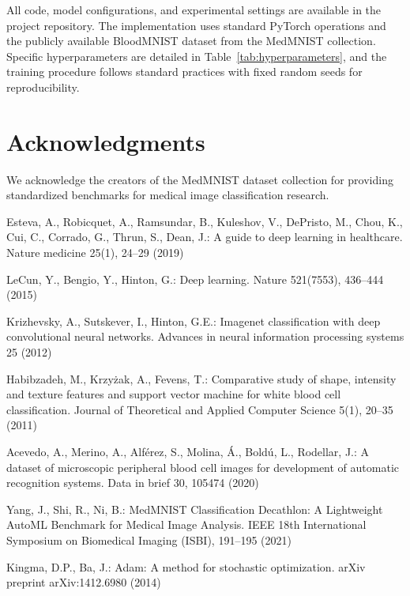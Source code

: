 \documentclass[runningheads]{llncs}
\begin{document}
All code, model configurations, and experimental settings are available in the project repository. The implementation uses standard PyTorch operations and the publicly available BloodMNIST dataset from the MedMNIST collection. Specific hyperparameters are detailed in Table~\ref{tab:hyperparameters}, and the training procedure follows standard practices with fixed random seeds for reproducibility.

\section*{Acknowledgments}

We acknowledge the creators of the MedMNIST dataset collection for providing standardized benchmarks for medical image classification research.

\begin{thebibliography}{10}

Esteva, A., Robicquet, A., Ramsundar, B., Kuleshov, V., DePristo, M., Chou, K., Cui, C., Corrado, G., Thrun, S., Dean, J.:
A guide to deep learning in healthcare.
Nature medicine 25(1), 24--29 (2019)

LeCun, Y., Bengio, Y., Hinton, G.:
Deep learning.
Nature 521(7553), 436--444 (2015)

Krizhevsky, A., Sutskever, I., Hinton, G.E.:
Imagenet classification with deep convolutional neural networks.
Advances in neural information processing systems 25 (2012)

Habibzadeh, M., Krzy{\.z}ak, A., Fevens, T.:
Comparative study of shape, intensity and texture features and support vector machine for white blood cell classification.
Journal of Theoretical and Applied Computer Science 5(1), 20--35 (2011)

Acevedo, A., Merino, A., Alférez, S., Molina, Á., Boldú, L., Rodellar, J.:
A dataset of microscopic peripheral blood cell images for development of automatic recognition systems.
Data in brief 30, 105474 (2020)

Yang, J., Shi, R., Ni, B.:
MedMNIST Classification Decathlon: A Lightweight AutoML Benchmark for Medical Image Analysis.
IEEE 18th International Symposium on Biomedical Imaging (ISBI), 191--195 (2021)

Kingma, D.P., Ba, J.:
Adam: A method for stochastic optimization.
arXiv preprint arXiv:1412.6980 (2014)

\end{thebibliography}
\end{document}
